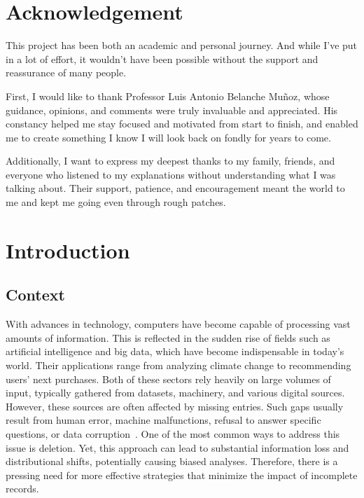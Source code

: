 \documentclass[a4paper,12pt]{article}
\begin{document}
\section{Acknowledgement}
This project has been both an academic and personal journey. And while I've put in a lot of effort, it wouldn't have been possible without the support and reassurance of many people.

First, I would like to thank Professor Luis Antonio Belanche Muñoz, whose guidance, opinions, and comments were truly invaluable and appreciated. His constancy helped me stay focused and motivated from start to finish, and enabled me to create something I know I will look back on fondly for years to come.

Additionally, I want to express my deepest thanks to my family, friends, and everyone who listened to my explanations without understanding what I was talking about. Their support, patience, and encouragement meant the world to me and kept me going even through rough patches.
\newpage
\section{Introduction}

\subsection{Context}
With advances in technology, computers have become capable of processing vast amounts of information. This is reflected in the sudden rise of fields such as artificial intelligence and big data, which have become indispensable in today's world. Their applications range from analyzing climate change to recommending users' next purchases. Both of these sectors rely heavily on large volumes of input, typically gathered from datasets, machinery, and various digital sources.\\

However, these sources are often affected by missing entries. Such gaps usually result from human error, machine malfunctions, refusal to answer specific questions, or data corruption~\cite{1}. One of the most common ways to address this issue is deletion. Yet, this approach can lead to substantial information loss and distributional shifts, potentially causing biased analyses. Therefore, there is a pressing need for more effective strategies that minimize the impact of incomplete records.
\end{document}
